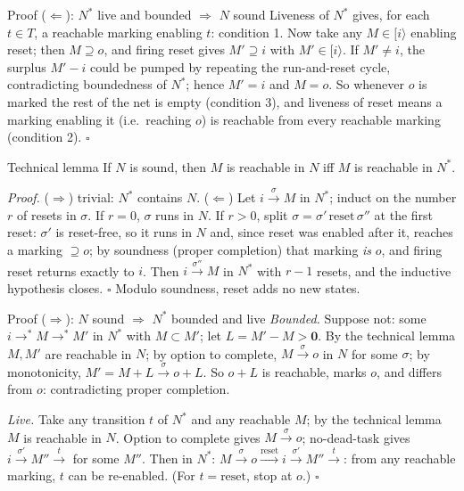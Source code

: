 \begin{definitionbox}{Proof ($\Leftarrow$): $N^*$ live and bounded $\Rightarrow$ $N$ sound}
Liveness of $N^*$ gives, for each $t \in T$, a reachable marking enabling $t$: condition 1. Now take any $M \in [i\rangle$ enabling reset; then $M \supseteq o$, and firing reset gives $M' \supseteq i$ with $M' \in [i\rangle$. If $M' \neq i$, the surplus $M' - i$ could be pumped by repeating the run-and-reset cycle, contradicting boundedness of $N^*$; hence $M' = i$ and $M = o$. So whenever $o$ is marked the rest of the net is empty (condition 3), and liveness of reset means a marking enabling it (i.e.\ reaching $o$) is reachable from every reachable marking (condition 2). \hfill$\square$
\end{definitionbox}

\begin{definitionbox}{Technical lemma}
If $N$ is sound, then $M$ is reachable in $N$ iff $M$ is reachable in $N^*$.
\par\smallskip
\textit{Proof.} ($\Rightarrow$) trivial: $N^*$ contains $N$. ($\Leftarrow$) Let $i \xrightarrow{\sigma} M$ in $N^*$; induct on the number $r$ of resets in $\sigma$. If $r = 0$, $\sigma$ runs in $N$. If $r > 0$, split $\sigma = \sigma'\, \text{reset}\, \sigma''$ at the first reset: $\sigma'$ is reset-free, so it runs in $N$ and, since reset was enabled after it, reaches a marking $\supseteq o$; by soundness (proper completion) that marking \emph{is} $o$, and firing reset returns exactly to $i$. Then $i \xrightarrow{\sigma''} M$ in $N^*$ with $r - 1$ resets, and the inductive hypothesis closes. \hfill$\square$ Modulo soundness, reset adds no new states.
\end{definitionbox}

\begin{definitionbox}{Proof ($\Rightarrow$): $N$ sound $\Rightarrow$ $N^*$ bounded and live}
\emph{Bounded.} Suppose not: some $i \to^\ast M \to^\ast M'$ in $N^*$ with $M \subset M'$; let $L = M' - M > \mathbf{0}$. By the technical lemma $M, M'$ are reachable in $N$; by option to complete, $M \xrightarrow{\sigma} o$ in $N$ for some $\sigma$; by monotonicity, $M' = M + L \xrightarrow{\sigma} o + L$. So $o + L$ is reachable, marks $o$, and differs from $o$: contradicting proper completion. \hfill
\par\smallskip
\emph{Live.} Take any transition $t$ of $N^*$ and any reachable $M$; by the technical lemma $M$ is reachable in $N$. Option to complete gives $M \xrightarrow{\sigma} o$; no-dead-task gives $i \xrightarrow{\sigma'} M'' \xrightarrow{t}$ for some $M''$. Then in $N^*$: $M \xrightarrow{\sigma} o \xrightarrow{\text{reset}} i \xrightarrow{\sigma'} M'' \xrightarrow{t}$: from any reachable marking, $t$ can be re-enabled. (For $t = \text{reset}$, stop at $o$.) \hfill$\square$
\end{definitionbox}

